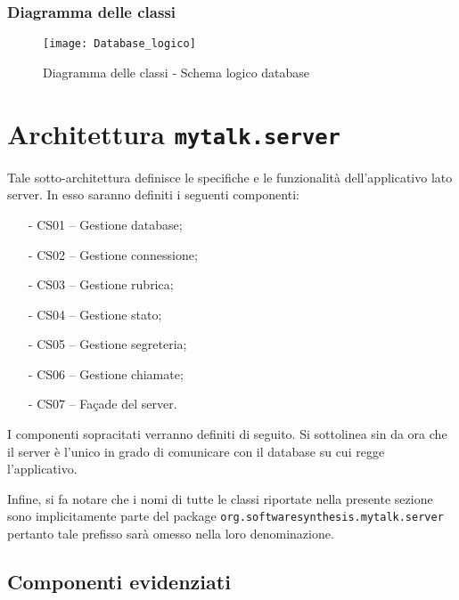 \subsubsection{Diagramma delle classi}
\begin{figure}[H]
\begin{center}
\texttt{[image: Database\_logico]}
\caption{Diagramma delle classi - Schema logico database}\label{fig:database_logico}
\end{center}
\end{figure}

\clearpage

\section{Architettura \texttt{mytalk.server}}\label{sec:server}
Tale sotto-architettura definisce le specifiche e le funzionalità dell'applicativo lato server. In esso saranno definiti i seguenti componenti:
\begin{itemize}[noitemsep,nolistsep]
	\item[-] \textsf{CS01 -- Gestione database};
	\item[-] \textsf{CS02 -- Gestione connessione};
	\item[-] \textsf{CS03 -- Gestione rubrica};
	\item[-] \textsf{CS04 -- Gestione stato};
	\item[-] \textsf{CS05 -- Gestione segreteria};
	\item[-] \textsf{CS06 -- Gestione chiamate};
	\item[-] \textsf{CS07 -- Façade del server}.
\end{itemize}

I componenti sopracitati verranno definiti di seguito. Si sottolinea sin da ora che il server è l'unico in grado di comunicare con il database su cui regge l'applicativo.

Infine, si fa notare che i nomi di tutte le classi riportate nella presente sezione sono implicitamente parte del package \texttt{org.softwaresynthesis.mytalk.server} pertanto tale prefisso sarà omesso nella loro denominazione.

\subsection{Componenti evidenziati}


